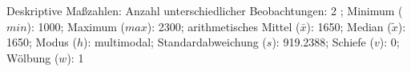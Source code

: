 				\label{tableValues:cjob0527d}
				\vspace*{-\baselineskip}
                    \begin{noten}
                	    \note{} Deskriptive Maßzahlen:
                	    Anzahl unterschiedlicher Beobachtungen: 2%
                	    ; 
                	      Minimum ($min$): 1000; 
                	      Maximum ($max$): 2300; 
                	      arithmetisches Mittel ($\bar{x}$): \num[round-mode=places,round-precision=2]{1650}; 
                	      Median ($\tilde{x}$): 1650; 
                	      Modus ($h$): multimodal; 
                	      Standardabweichung ($s$): \num[round-mode=places,round-precision=2]{919.2388}; 
                	      Schiefe ($v$): \num[round-mode=places,round-precision=2]{0}; 
                	      Wölbung ($w$): \num[round-mode=places,round-precision=2]{1}
                     \end{noten}


